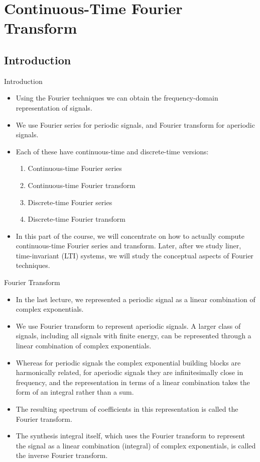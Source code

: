 \section{Continuous-Time Fourier Transform}

\subsection{Introduction}
\begin{frame}{Introduction}
    \begin{itemize}[<+->]
      \item Using the Fourier techniques we can obtain the frequency-domain representation of signals.
      \item We use Fourier series for periodic signals, and Fourier transform for aperiodic signals.
      \item Each of these have continuous-time and discrete-time versions:
        \begin{enumerate}
            \item Continuous-time Fourier series
            \item Continuous-time Fourier transform
            \item Discrete-time Fourier series
            \item Discrete-time Fourier transform
        \end{enumerate}
      \item In this part of the course, we will concentrate on how to actually compute continuous-time Fourier series and transform. Later, after we study liner, time-invariant (LTI) systems, we will study the conceptual aspects of Fourier techniques.
    \end{itemize}
\end{frame}

\begin{frame}{Fourier Transform}
    \begin{itemize}[<+->]
          \item In the last lecture, we represented a periodic signal as a linear combination of complex exponentials.
          \item We use Fourier transform to represent aperiodic signals. A larger class of signals, including all signals with finite energy, can be represented through a linear combination of complex exponentials.
          \item Whereas for periodic signals the complex exponential building blocks are harmonically related, for aperiodic signals they are infinitesimally close in frequency, and the representation in terms of a linear combination takes the form of an integral rather than a sum.
          \item The resulting spectrum of coefficients in this representation is called the \alert{Fourier transform}.
          \item The synthesis integral itself, which uses the Fourier transform to represent the signal as a linear combination (integral) of complex exponentials, is called the \alert{inverse Fourier transform}.
      \end{itemize}
\end{frame}



